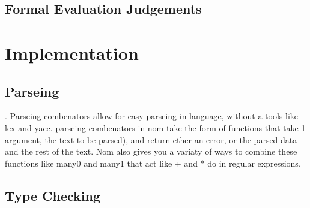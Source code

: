 \documentclass[12pt]{report}
\begin{document}
  \begin{mathpar}
\end{mathpar}


  \begin{mathpar}
\end{mathpar}

\section{Formal Evaluation Judgements}

\chapter{Implementation}
\section{Parseing}
\begin{paragraph}
  \cite{nom}. Parseing combenators \cite{Leijen2001ParsecDS} allow for easy parseing in-language, without a tools like lex and yacc\cite{lexandyacc}. parseing combenators in nom take the form of functions that take 1 argument, the text to be parsed), and return ether an error, or the parsed data and the rest of the text. Nom also gives you a variaty of ways to  combine these functions like many0 and many1 that act like + and * do in regular expressions.
\end{paragraph}
\section{Type Checking}
\end{document}

